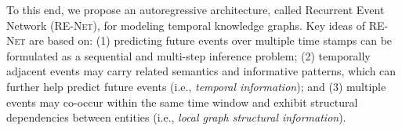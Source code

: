 \documentclass[11pt,a4paper]{article}
\newcommand{\method}{\textsc{RE-Net}\xspace}
\newcommand{\ie}{{i.e.}}
\begin{document}




To this end, we propose an autoregressive architecture, called Recurrent Event Network (\method), for modeling temporal knowledge graphs.
Key ideas of \method are based on:
(1) predicting future events over multiple time stamps can be formulated as a sequential and multi-step inference problem;
(2) temporally adjacent events may carry related semantics and informative patterns, which can further help predict future events (\ie, \textit{temporal information}); 
and (3) multiple events may co-occur within the same time window and exhibit structural dependencies between entities (\ie, \textit{local graph structural information}).
\end{document}
